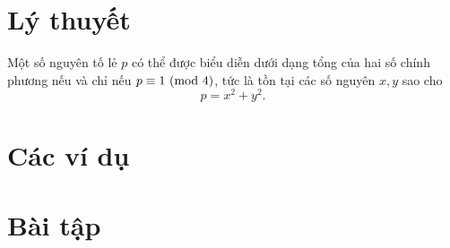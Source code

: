 \documentclass[../../imo-training-open-book.tex]{subfiles}
\begin{document}
\section{Lý thuyết}

\begin{theorem*}
    \label{theorem:fermat-sums-of-two-squares-theorem}
    Một số nguyên tố lẻ \( p \) có thể được biểu diễn dưới dạng tổng của hai số chính phương nếu và chỉ nếu \( p \equiv 1 \ (\mathrm{mod}\ 4) \),
    tức là tồn tại các số nguyên \( x, y \) sao cho
    \[
        p = x^2 + y^2.
    \]
\end{theorem*}

\newpage

\section{Các ví dụ}

 \newpage
 \newpage
 \newpage

\section{Bài tập}

 \bigbreak

\newpage
\end{document}
